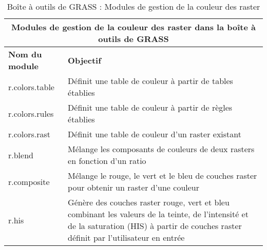 \begin{table}[H]
\centering
 \begin{tabular}{|p{4cm}|p{10cm}|}
  \hline \multicolumn{2}{|c|}{\textbf{Modules de gestion de la couleur des raster dans la boîte à outils de GRASS}} \\
  \hline \textbf{Nom du module} & \textbf{Objectif} \\
  \hline r.colors.table & Définit une table de couleur à partir de tables établies \\
  \hline r.colors.rules & Définit une table de couleur à partir de règles établies \\
  \hline r.colors.rast & Définit une table de couleur d'un raster existant \\
  \hline r.blend & Mélange les composants de couleurs de deux rasters en fonction d'un ratio \\
  \hline r.composite & Mélange le rouge, le vert et le bleu de couches raster pour obtenir un raster d'une couleur \\
  \hline r.his & Génère des couches raster rouge, vert et bleu combinant les valeurs de la teinte, de l'intensité et de la saturation (HIS) à partir de couches raster définit par l'utilisateur en entrée \\
\hline
\end{tabular}
\caption{Boîte à outils de GRASS : Modules de gestion de la couleur des raster}
\end{table}

